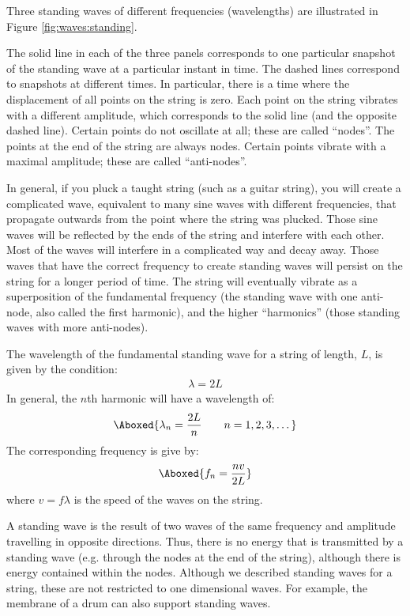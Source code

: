 Three standing waves of different frequencies (wavelengths) are illustrated in Figure \ref{fig:waves:standing}.

The solid line in each of the three panels corresponds to one particular snapshot of the standing wave at a particular instant in time. The dashed lines correspond to snapshots at different times. In particular, there is a time where the displacement of all points on the string is zero. Each point on the string vibrates with a different amplitude, which corresponds to the solid line (and the opposite dashed line). Certain points do not oscillate at all; these are called ``nodes''. The points at the end of the string are always nodes. Certain points vibrate with a maximal amplitude; these are called ``anti-nodes''.

In general, if you pluck a taught string (such as a guitar string), you will create a complicated wave, equivalent to many sine waves with different frequencies, that propagate outwards from the point where the string was plucked. Those sine waves will be reflected by the ends of the string and interfere with each other. Most of the waves will interfere in a complicated way and decay away. Those waves that have the correct frequency to create standing waves will persist on the string for a longer period of time. The string will eventually vibrate as a superposition of the fundamental frequency (the standing wave with one anti-node, also called the first harmonic), and the higher ``harmonics'' (those standing waves with more anti-nodes).

The wavelength of the fundamental standing wave for a string of length, $L$, is given by the condition:
\begin{align*}
\lambda = 2L
\end{align*}
In general, the $n$th harmonic will have a wavelength of:
\begin{align}
\Aboxed{\lambda_n = \frac{2L}{n}\quad\quad n=1,2,3,\dots}
\end{align}
The corresponding frequency is give by:
\begin{align}
\Aboxed{f_n =\frac{nv}{2L}}
\end{align}
where $v=f\lambda$ is the speed of the waves on the string.

A standing wave is the result of two waves of the same frequency and amplitude travelling in opposite directions. Thus, there is no energy that is transmitted by a standing wave (e.g. through the nodes at the end of the string), although there is energy contained within the nodes. Although we described standing waves for a string, these are not restricted to one dimensional waves. For example, the membrane of a drum can also support standing waves.

